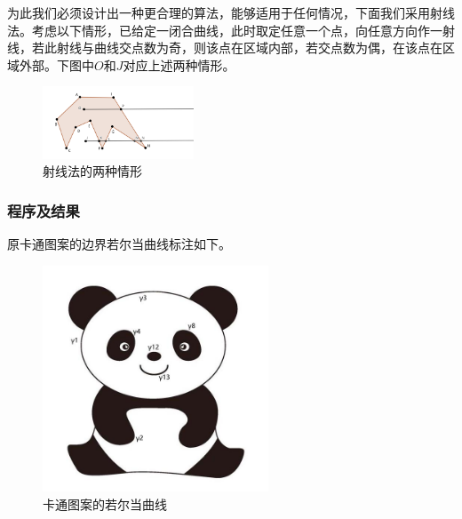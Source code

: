 \documentclass{article}
\begin{document}
	为此我们必须设计出一种更合理的算法，能够适用于任何情况，下面我们采用射线法。考虑以下情形，已给定一闭合曲线，此时取定任意一个点，向任意方向作一射线，若此射线与曲线交点数为奇，则该点在区域内部，若交点数为偶，在该点在区域外部。下图中$O$和$J$对应上述两种情形。
	\begin{figure}[h]
		\centering
		\includegraphics[width=0.4\textwidth]{raymethod.png}
		\caption{射线法的两种情形}
	\end{figure}
	
	\newpage
	\subsubsection{程序及结果}
	原卡通图案的边界若尔当曲线标注如下。
	\begin{figure}[h]
		\centering
		\includegraphics[width=0.6\textwidth]{pandanote.jpg}
		\caption{卡通图案的若尔当曲线}
	\end{figure}
\end{document}

